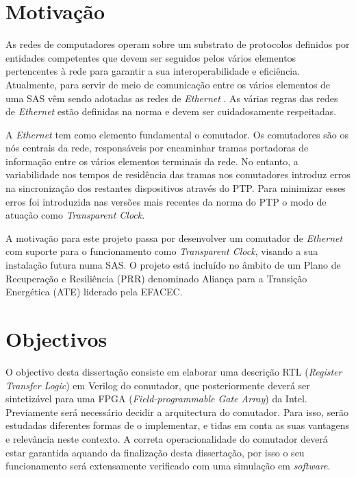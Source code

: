 \section{Motivação}
\label{section:motivation}

 As redes de computadores operam sobre um substrato de protocolos definidos por entidades competentes que devem ser seguidos pelos vários elementos pertencentes à rede para garantir a sua interoperabilidade e eficiência. Atualmente, para servir de meio de comunicação entre os vários elementos de uma SAS vêm sendo adotadas as redes de \textit{Ethernet} \cite{ethernet}. As várias regras das redes de \textit{Ethernet} estão definidas na norma e devem ser cuidadosamente respeitadas. \par 
A \textit{Ethernet} tem como elemento fundamental o comutador. Os comutadores são os nós centrais da rede, responsáveis por encaminhar tramas portadoras de informação entre os vários elementos terminais da rede. No entanto, a variabilidade nos tempos de residência das tramas nos comutadores introduz erros na sincronização dos restantes dispositivos através do PTP. Para minimizar esses erros foi introduzida nas versões mais recentes da norma do PTP o modo de atuação como \textit{Transparent Clock}. \par 
A motivação para este projeto passa por desenvolver um comutador de \textit{Ethernet} com suporte para o funcionamento como \textit{Transparent Clock}, visando a sua instalação futura numa SAS. O projeto está incluído no âmbito de um Plano de Recuperação e Resiliência (PRR) denominado Aliança para a Transição Energética (ATE) liderado pela EFACEC.


\section{Objectivos}
\label{section:overview}

O objectivo desta dissertação consiste em elaborar uma descrição RTL (\textit{Register Transfer Logic}) em Verilog do comutador, que posteriormente deverá ser sintetizável para uma FPGA (\textit{Field-programmable Gate Array}) da Intel. Previamente será necessário decidir a arquitectura do comutador. Para isso, serão estudadas diferentes formas de o implementar, e tidas em conta as suas vantagens e relevância neste contexto. A correta operacionalidade do comutador deverá estar garantida aquando da finalização desta dissertação, por isso o seu funcionamento será extensamente verificado com uma simulação em \textit{software}.

